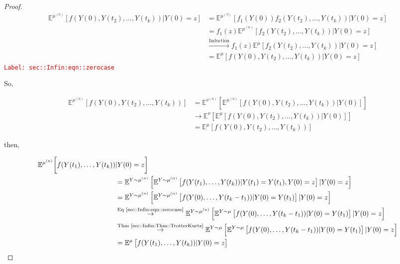 \documentclass[12pt]{article}
\newcommand{\mb}{\mathbb}
\newcommand{\ra}{\rightarrow}
\newcommand{\os}{\overset}
\newcommand{\te}{\text}
\newcommand{\tr}{\textcolor{red}}
\newcommand{\labe}[1]{\tr{\texttt{Label: #1}}}
\newcommand{\exmu}[2]{\mb{E}^{#1}\left[#2\right]}	%
\renewcommand{\t}{t}							%
\newcommand{\tp}[1]{(#1)}						%
\newcommand{\sln}[1]{^{(#1)}}					%
\newcommand{\indx}[1]{_{#1}}					%
\newcommand{\m}{\mu}							%
\newcommand{\mm}{\nu}							%
\newcommand{\me}[1]{^{#1}}						%
\newcommand{\XX}{Y}								%
\renewcommand{\it}{k}							%
\newcommand{\xxx}{z}							%
\begin{document}
\begin{proof}
\begin{align}
\exmu{\m\sln{n}}{f(\XX\tp{0},\XX\tp{\t\indx{2}},\dots,\XX\tp{\t\indx{\it}})|\XX\tp{0} = \xxx}&= \exmu{\m\sln{n}}{f\indx{1}(\XX\tp{0})f\indx{2}(\XX\tp{\t\indx{2}},\dots,\XX\tp{\t\indx{k}})|\XX\tp{0}=\xxx}\nonumber\\
&= f\indx{1}(\xxx)\exmu{\m\sln{n}}{f\indx{2}(\XX\tp{\t\indx{2}},\dots,\XX\tp{\t\indx{k}})|\XX\tp{0}=\xxx}\nonumber\\
&\os{\te{Induction}}{\ra} f\indx{1}(\xxx)\exmu{\m}{f\indx{2}(\XX\tp{\t\indx{2}},\dots,\XX\tp{\t\indx{k}})|\XX\tp{0}=\xxx}\nonumber\\
&= \exmu{\m}{f(\XX\tp{0},\XX\tp{\t\indx{2}},\dots,\XX\tp{\t\indx{\it}})|\XX\tp{0}=\xxx}
\label{sec::Infin:eqn::zerocase}
\end{align}
\labe{sec::Infin:eqn::zerocase}

So,

\begin{align*}
\exmu{\m\sln{n}}{f(\XX\tp{0},\XX\tp{\t\indx{2}},\dots,\XX\tp{\t\indx{\it}})} &= \exmu{\mm\sln{n}}{\exmu{\m\sln{n}}{f(\XX\tp{0},\XX\tp{\t\indx{2}},\dots,\XX\tp{\t\indx{\it}})|\XX\tp{0}}}\\
&\ra \exmu{\mm}{\exmu{\m}{f(\XX\tp{0},\XX\tp{\t\indx{2}},\dots,\XX\tp{\t\indx{\it}})|\XX\tp{0}}}\\
&= \exmu{\m}{f(\XX\tp{0},\XX\tp{\t\indx{2}},\dots,\XX\tp{\t\indx{\it}})}
\end{align*}

then,

\begin{align*}
\mb{E}\me{\m\sln{n}}\bigg[f(\XX\tp{\t\indx{1}},\dots,\XX\tp{\t\indx{\it}})&|\XX\tp{0}=\xxx\bigg]\\
&=\exmu{\XX\sim\m\sln{n}}{\exmu{\XX\sim \m\sln{n}}{f(\XX\tp{\t\indx{1}},\dots,\XX\tp{\t\indx{\it}})|\XX\tp{\t\indx{1}}=\XX\tp{\t\indx{1}},\XX\tp{0}=\xxx}|\XX\tp{0}=\xxx}\\
&=\exmu{\XX\sim\m\sln{n}}{\exmu{\XX\sim \m\sln{n}}{f(\XX\tp{0},\dots,\XX\tp{\t\indx{\it}-\t\indx{1}})|\XX\tp{0}=\XX\tp{\t\indx{1}}}|\XX\tp{0}=\xxx}\\
&\os{\te{Eq \eqref{sec::Infin:eqn::zerocase}}}{\ra} \exmu{\XX\sim\m\sln{n}}{\exmu{\XX\sim \m}{f(\XX\tp{0},\dots,\XX\tp{\t\indx{\it}-\t\indx{1}})|\XX\tp{0}=\XX\tp{\t\indx{1}}}|\XX\tp{0}=\xxx}\\
&\os{\te{Thm \ref{sec::Infin:Thm::TrotterKurtz}}}{\ra} \exmu{\XX\sim\m}{\exmu{\XX\sim \m}{f(\XX\tp{0},\dots,\XX\tp{\t\indx{\it}-\t\indx{1}})|\XX\tp{0}=\XX\tp{\t\indx{1}}}|\XX\tp{0}=\xxx}\\
&=\exmu{\m}{f(\XX\tp{\t\indx{1}},\dots,\XX\tp{\t\indx{\it}})|\XX\tp{0}=\xxx}
\end{align*}


\end{proof}
\end{document}
